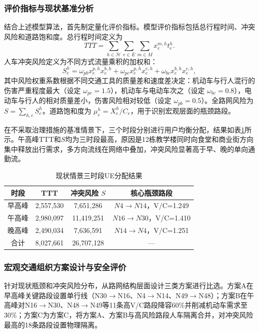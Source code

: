 \documentclass[UTF8,zihao=-4,a4paper]{ctexart}
\numberwithin{table}{section}
\numberwithin{figure}{section}
\numberwithin{equation}{section}
\begin{document}
\subsubsection{评价指标与现状基准分析}

结合上述模型算法，首先制定量化评价指标。模型评价指标包括总行程时间、冲突风险和道路饱和度。总行程时间定义为
\begin{equation}
TTT=\sum_{h\in\mathcal{H}}\sum_{e\in E}\sum_{m\in M}x_e^{m,h}t_e^h.
\end{equation}
人车冲突风险定义为不同方式流量乘积的加权和：
\begin{equation}
S_e^h=\omega_{pb}x_e^{p,h}x_e^{b,h}+\omega_{pc}x_e^{p,h}x_e^{c,h}+\omega_{bc}x_e^{b,h}x_e^{c,h},
\end{equation}
其中风险权重系数根据不同交通工具的质量差和速度差决定：机动车与行人混行的伤害严重程度最大（设定 $\omega_{pc}=1.5$），机动车与电动车次之（设定 $\omega_{bc}=0.8$），电动车与行人的相对质量差小，伤害风险相对较低（设定 $\omega_{pb}=0.5$）。全路网风险为 $S=\sum_{h,e}S_e^h$。道路饱和度为 $\mu_e^h=X_e^h/C_e$，用于识别宏观层面的瓶颈路段。

在不采取治理措施的基准情景下，三个时段分别进行用户均衡分配，结果如表\ref{tab:baseline}所示。午高峰TTT和$S$均为三时段最高，原因是12栋教学楼同时向食堂和商业街方向集中释放出行需求，多方向流线在网络中叠加，冲突风险显著高于早、晚的单向通勤流。

\begin{table}[H]
\footnotesize
\centering
\caption{现状情景三时段UE分配结果}
\label{tab:baseline}
\begin{tabular}{cccc}
\toprule
\textbf{时段} & \textbf{TTT} & \textbf{冲突风险 $S$} & \textbf{核心瓶颈路段} \\
\midrule
早高峰 & 2,557,530 & 7,651,286 & $N4\rightarrow N14$，V/C=1.249 \\
午高峰 & 2,980,097 & 11,419,251 & $N16\rightarrow N30$，V/C=1.410 \\
晚高峰 & 2,490,034 & 7,636,591 & $N14\rightarrow N4$，V/C=1.251 \\
\midrule
合计 & 8,027,661 & 26,707,128 & --- \\
\bottomrule
\end{tabular}
\end{table}

\subsubsection{宏观交通组织方案设计与安全评价}

针对现状瓶颈和冲突风险分布，从路网结构层面设计三类方案进行比选。方案A在早高峰关键路段设置单行线（N30$\to$N16、N4$\to$N14、N49$\to$N48）；方案B在午高峰对N16$\to$N30、N48$\to$N49等11条高V/C路段降容60\%并削减机动车需求至30\%；方案C为方案C，将方案A、方案B与高风险路段人车隔离合并，对冲突风险最高的18条路段设置物理隔离。
\end{document}
